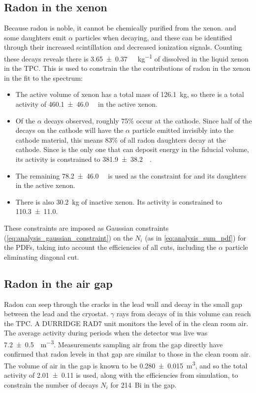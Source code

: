 \documentclass[herrin-thesis.tex]{subfiles}
\begin{document}
\subsection{Radon in the xenon}
Because radon is noble, it cannot be chemically purified from the xenon.  and some daughters emit \(\alpha\) particles when decaying, and these can be identified through their increased scintillation and decreased ionization signals. Counting these decays reveals there is \SI{3.65\pm0.37}{\micro\Bq\per\kg} of  dissolved in the liquid xenon in the TPC. This is used to constrain the the contributions of radon in the xenon in the fit to the spectrum:
\begin{itemize}
\item The active volume of xenon has a total mass of \SI{126.1}{\kg}, so there is a total activity of \SI{460.1\pm46.0}{\micro\Bq} in the active xenon.
\item Of the  \(\alpha\) decays observed, roughly 75\% occur at the cathode. Since half of the decays on the cathode will have the \(\alpha\) particle emitted invisibly into the cathode material, this means 83\% of all radon daughters decay at the cathode. Since  is the only one that can deposit energy in the fiducial volume, its activity is constrained to \SI{381.9\pm38.2}{\micro\Bq}.
\item The remaining \SI{78.2\pm46.0}{\micro\Bq} is used as the constraint for  and its daughters in the active xenon.
\item There is also \SI{30.2}{\kg} of inactive xenon. Its activity is constrained to \SI{110.3\pm11.0}{\Bq}.
\end{itemize}
These constraints are imposed as Gaussian constraints (\cref{eq:analysis_gaussian_constraint}) on the \(N_i\) (as in \cref{eq:analysis_sum_pdf}) for the PDFs, taking into account the efficiencies of all cuts, including the \(\alpha\) particle eliminating diagonal cut.

\subsection{Radon in the air gap}
Radon can seep through the cracks in the lead wall and decay in the small gap between the lead and the cryostat. \(\gamma\) rays from decays of  in this volume can reach the TPC. A DURRIDGE RAD7 unit monitors the level of  in the clean room air. The average activity during periods when the detector was live was \SI{7.2\pm0.5}{\Bq\per\cubic\meter}. Measurements sampling air from the gap directly have confirmed that radon levels in that gap are similar to those in the clean room air. The volume of air in the gap is known to be \SI{.280\pm0.015}{\cubic\meter}, and so the total activity of \SI{2.01\pm 0.11}{\Bq} is used, along with the efficiencies from simulation, to constrain the number of decays \(N_i\) for \SI{214}{Bi} in the gap.
\end{document}

